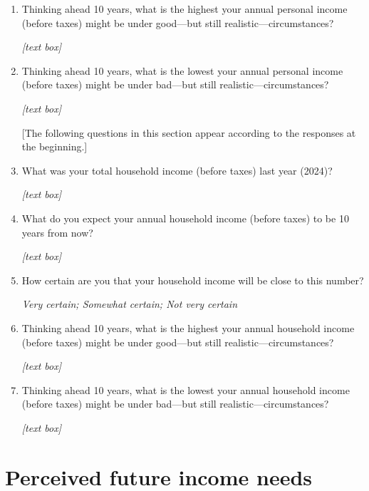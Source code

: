 \documentclass[11pt, headsepline]{article}
\begin{document}
\begin{enumerate}[resume]
    \textit{Very certain; Somewhat certain; Not very certain}

     \item Thinking ahead 10 years, what is the highest your annual personal income (before taxes) might be under good—but still realistic—circumstances?

    \textit{[text box]}

    \item Thinking ahead 10 years, what is the lowest your annual personal income (before taxes) might be under bad—but still realistic—circumstances?

    \textit{[text box]}

    [The following questions in this section appear according to the responses at the beginning.]

    \item What was your total household income (before taxes) last year (2024)?

    \textit{[text box]}

    \item What do you expect your annual household income (before taxes) to be 10 years from now? 

    \textit{[text box]}

    \item How certain are you that your household income will be close to this number?

    \textit{Very certain; Somewhat certain; Not very certain}

    \item Thinking ahead 10 years, what is the highest your annual household income (before taxes) might be under good—but still realistic—circumstances?

    \textit{[text box]}

    \item Thinking ahead 10 years, what is the lowest your annual household income (before taxes) might be under bad—but still realistic—circumstances?

    \textit{[text box]}
    
\end{enumerate}

\section*{Perceived future income needs}
\end{document}
